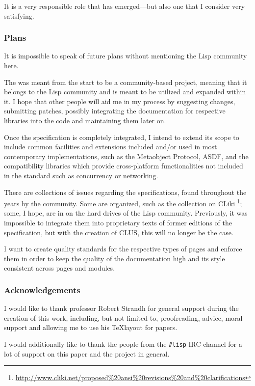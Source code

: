It is a very responsible role that has emerged---but also one that I consider very satisfying.

\subsubsection{Plans}

It is impossible to speak of future plans without mentioning the Lisp community here.

The \cl{} \us{} was meant from the start to be a community-based project, meaning that it belongs to the Lisp community and is meant to be utilized and expanded within it. I hope that other people will aid me in my process by suggesting changes, submitting patches, possibly integrating the documentation for respective \cl{} libraries into the code and maintaining them later on.

Once the specification is completely integrated, I intend to extend its scope to include common facilities and extensions included and/or used in most contemporary \cl{} implementations, such as the Metaobject Protocol, ASDF, \ql{} and the compatibility libraries which provide cross-platform functionalities not included in the standard such as concurrency or networking.

There are collections of issues regarding the specifications, found throughout the years by the community. Some are organized, such as the collection on CLiki \footnote{\url{http://www.cliki.net/proposed\%20ansi\%20revisions\%20and\%20clarifications}}; some, I hope, are in on the hard drives of the Lisp community. Previously, it was impossible to integrate them into proprietary texts of former editions of the specification, but with the creation of CLUS, this will no longer be the case.

I want to create quality standards for the respective types of pages and enforce them in order to keep the quality of the documentation high and its style consistent across pages and modules.

\subsubsection{Acknowledgements}

I would like to thank professor Robert Strandh for general support during the creation of this work, including, but not limited to, proofreading, advice, moral support and allowing me to use his \TeX layout for papers.

I would additionally like to thank the people from the \texttt{\#lisp} IRC channel for a lot of support on this paper and the \cl{} \us{} project in general.
